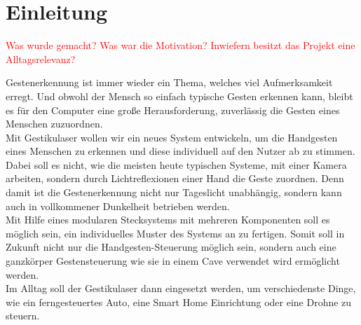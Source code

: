 \chapter{Einleitung}
\label{ch:Einleitung}

\textcolor{red}{Was wurde gemacht? Was war die Motivation? Inwiefern besitzt das Projekt eine Alltagsrelevanz?}

Gestenerkennung ist immer wieder ein Thema, welches viel Aufmerksamkeit erregt. Und obwohl der Mensch so einfach typische Gesten erkennen kann, bleibt es für den Computer eine große Herausforderung, zuverlässig die Gesten eines Menschen zuzuordnen. \\
Mit Gestikulaser wollen wir ein neues System entwickeln, um die Handgesten eines Menschen zu erkennen und diese individuell auf den Nutzer ab zu stimmen. Dabei soll es nicht, wie die meisten heute typischen Systeme, mit einer Kamera arbeiten, sondern durch Lichtreflexionen einer Hand die Geste zuordnen. Denn damit ist die Gestenerkennung nicht nur Tageslicht unabhängig, sondern kann auch in vollkommener Dunkelheit betrieben werden. \\
Mit Hilfe eines modularen Stecksystems mit mehreren Komponenten soll es möglich sein, ein individuelles Muster des Systems an zu fertigen. Somit soll in Zukunft nicht nur die Handgesten-Steuerung möglich sein, sondern auch eine ganzkörper Gestensteuerung wie sie in einem Cave verwendet wird ermöglicht werden. \\

Im Alltag soll der Gestikulaser dann eingesetzt werden, um verschiedenste Dinge, wie ein ferngesteuertes Auto, eine Smart Home Einrichtung oder eine Drohne zu steuern. 